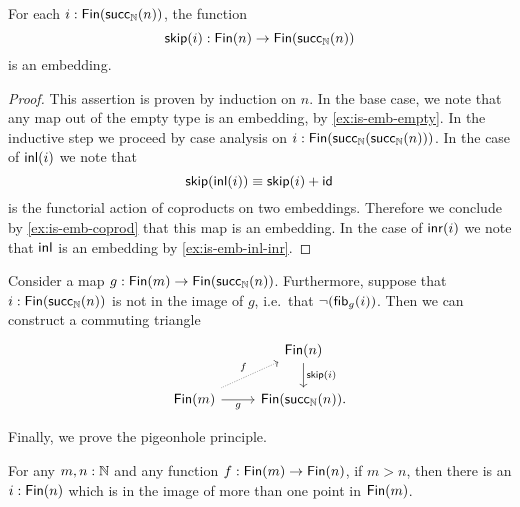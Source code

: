 \begin{lem}
  For each $i:\mathsf{Fin}(\mathsf{succ}_{{\mathbb{N}}}(n))$, the function
  \begin{equation*}
    \mathsf{skip}(i):\mathsf{Fin}(n)\to\mathsf{Fin}(\mathsf{succ}_{{\mathbb{N}}}(n))
  \end{equation*}
  is an embedding.
\end{lem}

\begin{proof}
  This assertion is proven by induction on $n$. In the base case, we note that any map out of the empty type is an embedding, by \cref{ex:is-emb-empty}. In the inductive step we proceed by case analysis on $i:\mathsf{Fin}(\mathsf{succ}_{{\mathbb{N}}}(\mathsf{succ}_{{\mathbb{N}}}(n)))$. In the case of ${\mathsf{inl}}(i)$ we note that
  \begin{equation*}
    \mathsf{skip}({\mathsf{inl}}(i))\equiv \mathsf{skip}(i)+\mathsf{id}_{}
  \end{equation*}
  is the functorial action of coproducts on two embeddings. Therefore we conclude by \cref{ex:is-emb-coprod} that this map is an embedding. In the case of ${\mathsf{inr}}(i)$ we note that ${\mathsf{inl}}$ is an embedding by \cref{ex:is-emb-inl-inr}.
\end{proof}

\begin{lem}
  Consider a map $g:\mathsf{Fin}(m)\to\mathsf{Fin}(\mathsf{succ}_{{\mathbb{N}}}(n))$. Furthermore, suppose that $i:\mathsf{Fin}(\mathsf{succ}_{{\mathbb{N}}}(n))$ is not in the image of $g$, i.e.~that $\neg(\mathsf{fib}_{g}(i))$. Then we can construct a commuting triangle
  \begin{equation*}
    \begin{tikzcd}
      & \Fin(n) \arrow[d,"\skipFin(i)"] \\
      \Fin(m) \arrow[r,swap,"g"] \arrow[ur,densely dotted,"f"] & \Fin(\succN(n)).
    \end{tikzcd}
  \end{equation*}
\end{lem}

Finally, we prove the pigeonhole principle.

\begin{thm}\label{thm:pigeonhole}
  For any $m,n:{\mathbb{N}}$ and any function $f:\mathsf{Fin}(m)\to\mathsf{Fin}(n)$, if $m>n$, then there is an $i:\mathsf{Fin}(n)$ which is in the image of more than one point in $\mathsf{Fin}(m)$.
\end{thm}

